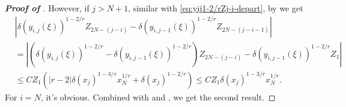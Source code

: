 \documentclass{amsart}
\theoremstyle{definition}
\theoremstyle{remark}
\numberwithin{equation}{section}
\begin{document}
\begin{proof} [\bf Proof of ]
  However, if \(j > N+1\), similar with \eqref{eq:yij1-2/rZj-i-depart}, by  we get
  \begin{equation*}
    \begin{aligned}
      & \left|  \delta(y_{i,j}(\xi))^{1-2/r} Z_{2N-(j-i)} - \delta(y_{i,j-1}(\xi))^{1-2/r} Z_{2N-(j-i-1)}  \right| \\
      & = \left|  \left( \delta(y_{i,j}(\xi))^{1-2/r} - \delta(y_{i,j-1}(\xi))^{1-2/r} \right) Z_{2N-(j-i)} - \delta(y_{i, j-1}(\xi))^{1-2/r} Z_1  \right|   \\
      &\le C Z_1 \left( |r-2| \delta(x_j)^{1-3/r} x_N^{1/r} + \delta(x_j)^{1-2/r}  \right) \le C Z_1 \delta(x_j)^{1-3/r} x_N^{1/r}.
    \end{aligned}
  \end{equation*}
  For \(i=N\), it's obvious.
  Combined with  and , we get the second result.
\end{proof}
\end{document}
